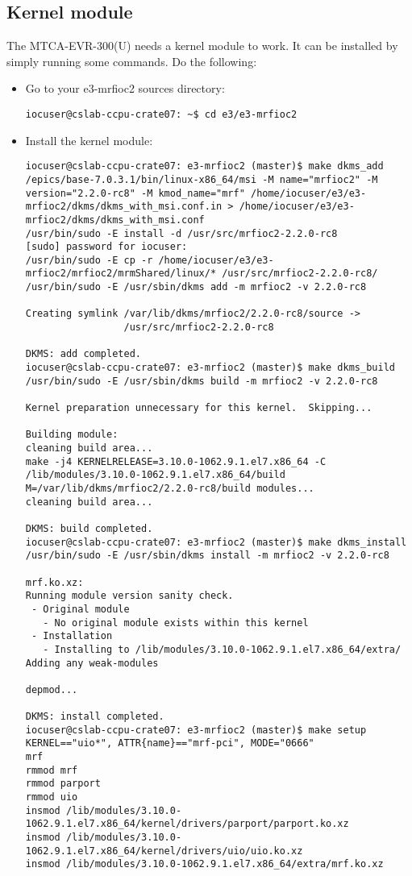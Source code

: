 \documentclass[11pt
  , a4paper
  , article
  , oneside
  , showtrims
]{memoir}
\begin{document}
{\subsection{Kernel module}
The MTCA-EVR-300(U) needs a kernel module to work. It can be installed by simply running some commands. Do the following:
\begin{itemize}
\item Go to your e3-mrfioc2 sources directory:
\begin{lstlisting}[style=termstyle]
iocuser@cslab-ccpu-crate07: ~$ cd e3/e3-mrfioc2
\end{lstlisting}
\item Install the kernel module:
\begin{lstlisting}[style=termstyle]
iocuser@cslab-ccpu-crate07: e3-mrfioc2 (master)$ make dkms_add
/epics/base-7.0.3.1/bin/linux-x86_64/msi -M name="mrfioc2" -M  version="2.2.0-rc8" -M kmod_name="mrf" /home/iocuser/e3/e3-mrfioc2/dkms/dkms_with_msi.conf.in > /home/iocuser/e3/e3-mrfioc2/dkms/dkms_with_msi.conf
/usr/bin/sudo -E install -d /usr/src/mrfioc2-2.2.0-rc8
[sudo] password for iocuser:
/usr/bin/sudo -E cp -r /home/iocuser/e3/e3-mrfioc2/mrfioc2/mrmShared/linux/* /usr/src/mrfioc2-2.2.0-rc8/
/usr/bin/sudo -E /usr/sbin/dkms add -m mrfioc2 -v 2.2.0-rc8

Creating symlink /var/lib/dkms/mrfioc2/2.2.0-rc8/source ->
                 /usr/src/mrfioc2-2.2.0-rc8

DKMS: add completed.
iocuser@cslab-ccpu-crate07: e3-mrfioc2 (master)$ make dkms_build
/usr/bin/sudo -E /usr/sbin/dkms build -m mrfioc2 -v 2.2.0-rc8

Kernel preparation unnecessary for this kernel.  Skipping...

Building module:
cleaning build area...
make -j4 KERNELRELEASE=3.10.0-1062.9.1.el7.x86_64 -C /lib/modules/3.10.0-1062.9.1.el7.x86_64/build M=/var/lib/dkms/mrfioc2/2.2.0-rc8/build modules...
cleaning build area...

DKMS: build completed.
iocuser@cslab-ccpu-crate07: e3-mrfioc2 (master)$ make dkms_install
/usr/bin/sudo -E /usr/sbin/dkms install -m mrfioc2 -v 2.2.0-rc8

mrf.ko.xz:
Running module version sanity check.
 - Original module
   - No original module exists within this kernel
 - Installation
   - Installing to /lib/modules/3.10.0-1062.9.1.el7.x86_64/extra/
Adding any weak-modules

depmod...

DKMS: install completed.
iocuser@cslab-ccpu-crate07: e3-mrfioc2 (master)$ make setup
KERNEL=="uio*", ATTR{name}=="mrf-pci", MODE="0666"
mrf
rmmod mrf
rmmod parport
rmmod uio
insmod /lib/modules/3.10.0-1062.9.1.el7.x86_64/kernel/drivers/parport/parport.ko.xz
insmod /lib/modules/3.10.0-1062.9.1.el7.x86_64/kernel/drivers/uio/uio.ko.xz
insmod /lib/modules/3.10.0-1062.9.1.el7.x86_64/extra/mrf.ko.xz



\end{lstlisting}
\end{itemize}}
\end{document}
